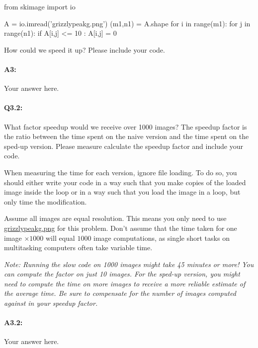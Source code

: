 \documentclass[11pt]{article}
\begin{document}
\begin{python}
from skimage import io

A = io.imread('grizzlypeakg.png')
(m1,n1) = A.shape
for i in range(m1):
    for j in range(n1):
        if A[i,j] <= 10 :
            A[i,j] = 0
\end{python}

How could we speed it up? Please include your code. \\

\paragraph{A3:} Your answer here.




\pagebreak
\paragraph{Q3.2:} What factor speedup would we receive over 1000 images? The speedup factor is the ratio between the time spent on the naive version and the time spent on the sped-up version. Please measure calculate the speedup factor and include your code.

When measuring the time for each version, ignore file loading. To do so, you should either write your code in a way such that you make copies of the loaded image inside the loop or in a way such that you load the image in a loop, but only time the modification.

Assume all images are equal resolution. This means you only need to use \href{grizzlypeakg.png}{grizzlypeakg.png} for this problem. Don't assume that the time taken for one image $\times1000$ will equal $1000$ image computations, as single short tasks on multitasking computers often take variable time.



\emph{Note: Running the slow code on 1000 images might take 45 minutes or more! You can compute the factor on just 10 images. For the sped-up version, you might need to compute the time on more images to receive a more reliable estimate of the average time. Be sure to compensate for the number of images computed against in your speedup factor.}

\paragraph{A3.2:} Your answer here.
\end{document}
